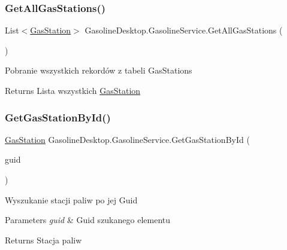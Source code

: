 \subsubsection{\texorpdfstring{GetAllGasStations()}{GetAllGasStations()}}
{\footnotesize\ttfamily List$<$\mbox{\hyperlink{class_gasoline_desktop_1_1_gas_station}{Gas\+Station}}$>$ Gasoline\+Desktop.\+Gasoline\+Service.\+Get\+All\+Gas\+Stations (\begin{DoxyParamCaption}{ }\end{DoxyParamCaption})}



Pobranie wszystkich rekordów z tabeli Gas\+Stations 

\begin{DoxyReturn}{Returns}
Lista wszystkich \mbox{\hyperlink{class_gasoline_desktop_1_1_gas_station}{Gas\+Station}}
\end{DoxyReturn}
\mbox{\label{class_gasoline_desktop_1_1_gasoline_service_a31cda76e3c9ed7c52935c42808704669}} 
\subsubsection{\texorpdfstring{GetGasStationById()}{GetGasStationById()}}
{\footnotesize\ttfamily \mbox{\hyperlink{class_gasoline_desktop_1_1_gas_station}{Gas\+Station}} Gasoline\+Desktop.\+Gasoline\+Service.\+Get\+Gas\+Station\+By\+Id (\begin{DoxyParamCaption}\item[{Guid}]{guid }\end{DoxyParamCaption})}



Wyszukanie stacji paliw po jej Guid 


\begin{DoxyParams}{Parameters}
{\em guid} & Guid szukanego elementu\\
\hline
\end{DoxyParams}
\begin{DoxyReturn}{Returns}
Stacja paliw
\end{DoxyReturn}
\mbox{\label{class_gasoline_desktop_1_1_gasoline_service_ad3d04448aa5de9033059fa6b79caaa4d}} 
